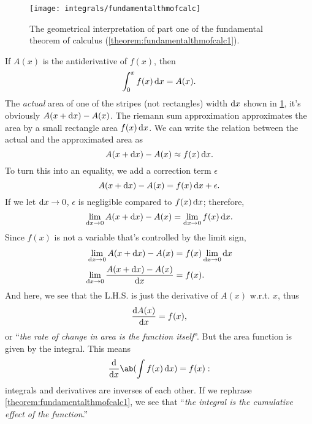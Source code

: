 \begin{figure}[b]
    \centering
    \texttt{[image: integrals/fundamentalthmofcalc]}
    \caption{The geometrical interpretation of part one of the fundamental theorem of calculus (\cref{theorem:fundamentalthmofcalc1}).}
    \label{fig:fundamentalthmofcalc}
\end{figure}
If $A(x)$ is the antiderivative of $f(x)$, then
\begin{equation}
    \int_{0}^{x} f(x)\odif{x} = A(x).
\end{equation}
The \emph{actual} area of one of the stripes (not rectangles) width $\odif{x}$ shown in \cref{fig:fundamentalthmofcalc}, it's obviously $A(x + \odif{x}) - A(x)$. The riemann sum approximation approximates the area by a small rectangle area $f(x)\odif{x}$. We can write the relation between the actual and the approximated area as
\begin{equation}
    A(x + \odif{x}) - A(x) \approx f(x)\odif{x}.
\end{equation}
To turn this into an equality, we add a correction term $\epsilon$
\begin{equation}
    A(x + \odif{x}) - A(x) = f(x)\odif{x} + \epsilon.
\end{equation}
If we let $\odif{x} \appr 0$, $\epsilon$ is negligible compared to $f(x)\odif{x}$; therefore,
\begin{equation}
    \lim_{\odif{x} \appr 0}A(x + \odif{x}) - A(x) = \lim_{\odif{x} \appr 0}f(x)\odif{x}.
\end{equation}
Since $f(x)$ is not a variable that's controlled by the limit sign,
\begin{align*}
    \lim_{\odif{x} \appr 0}A(x + \odif{x}) - A(x) &= f(x)\lim_{\odif{x} \appr 0}\odif{x} \\
    \lim_{\odif{x} \appr 0}\frac{A(x + \odif{x}) - A(x)}{\odif{x}} &= f(x).
\end{align*}
And here, we see that the L.H.S. is just the derivative of $A(x)$ w.r.t. $x$, thus
\begin{equation}
    \odv{A(x)}{x} = f(x),
\end{equation}
or ``\textit{the rate of change in area is the function itself}''. But the area function is given by the integral. This means
\begin{equation}
	\odv*{\ab(\int f(x)\odif{x})}{x} = f(x):
\end{equation}
integrals and derivatives are inverses of each other. If we rephrase \cref{theorem:fundamentalthmofcalc1}, we see that ``\textit{the integral is the cumulative effect of the function}.''


